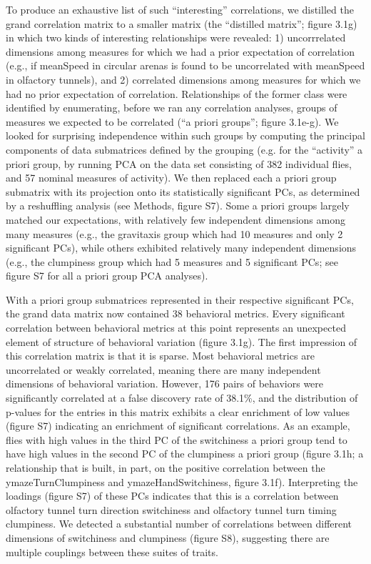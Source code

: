 \documentclass[12pt,letterpaper]{article}
\begin{document}
To produce an exhaustive list of such “interesting” correlations, we distilled the grand correlation matrix to a smaller matrix (the “distilled matrix”; figure 3.1g) in which two kinds of interesting relationships were revealed: 1) uncorrrelated dimensions among measures for which we had a prior expectation of correlation (e.g., if meanSpeed in circular arenas is found to be uncorrelated with meanSpeed in olfactory tunnels), and 2) correlated dimensions among measures for which we had no prior expectation of correlation. Relationships of the former class were identified by enumerating, before we ran any correlation analyses, groups of measures we expected to be correlated (“a priori groups”; figure 3.1e-g). We looked for surprising independence within such groups by computing the principal components of data submatrices defined by the grouping (e.g. for the “activity” a priori group, by running PCA on the data set consisting of 382 individual flies, and 57 nominal measures of activity). We then replaced each a priori group submatrix with its projection onto its statistically significant PCs, as determined by a reshuffling analysis (see Methods, figure S7). Some a priori groups largely matched our expectations, with relatively few independent dimensions among many measures (e.g., the gravitaxis group which had 10 measures and only 2 significant PCs), while others exhibited relatively many independent dimensions (e.g., the clumpiness group which had 5 measures and 5 significant PCs; see figure S7 for all a priori group PCA analyses). 

With a priori group submatrices represented in their respective significant PCs, the grand data matrix now contained 38 behavioral metrics. Every significant correlation between behavioral metrics at this point represents an unexpected element of structure of behavioral variation (figure 3.1g). The first impression of this correlation matrix is that it is sparse. Most behavioral metrics are uncorrelated or weakly correlated, meaning there are many independent dimensions of behavioral variation. However, 176 pairs of behaviors were significantly correlated at a false discovery rate of 38.1\%, and the distribution of p-values for the entries in this matrix exhibits a clear enrichment of low values (figure S7) indicating an enrichment of significant correlations. As an example, flies with high values in the third PC of the switchiness a priori group tend to have high values in the second PC of the clumpiness a priori group (figure 3.1h; a relationship that is built, in part, on the positive correlation between the ymazeTurnClumpiness and ymazeHandSwitchiness, figure 3.1f). Interpreting the loadings (figure S7) of these PCs indicates that this is a correlation between olfactory tunnel turn direction switchiness and olfactory tunnel turn timing clumpiness. We detected a substantial number of correlations between different dimensions of switchiness and clumpiness (figure S8), suggesting there are multiple couplings between these suites of traits. 
\end{document}
